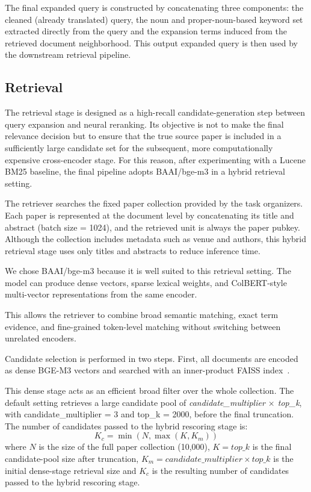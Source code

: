 The final expanded query is constructed by concatenating three components: the cleaned (already translated) query, the noun and proper-noun-based keyword set extracted directly from the query and the expansion terms induced from the retrieved document neighborhood.
This output expanded query is then used by the downstream retrieval pipeline.

\subsection{Retrieval} \label{sub:retrieval}
The retrieval stage is designed as a high-recall candidate-generation step between query expansion and neural reranking. Its objective is not to make the final relevance decision but to ensure that the true source paper is included in a sufficiently large candidate set for the subsequent, more computationally expensive cross-encoder stage. For this reason, after experimenting with a Lucene BM25 baseline, the final pipeline adopts BAAI/bge-m3 in a hybrid retrieval setting.

The retriever searches the fixed paper collection provided by the task organizers. Each paper is represented at the document level by concatenating its title and abstract (batch size = 1024), and the retrieved unit is always the paper pubkey. Although the collection includes metadata such as venue and authors, this hybrid retrieval stage uses only titles and abstracts to reduce inference time.

We chose BAAI/bge-m3 because it is well suited to this retrieval setting. The model can produce dense vectors, sparse lexical weights, and ColBERT-style multi-vector representations from the same encoder.

This allows the retriever to combine broad semantic matching, exact term evidence, and fine-grained token-level matching without switching between unrelated encoders.

Candidate selection is performed in two steps. First, all documents are encoded as dense BGE-M3 vectors and searched with an inner-product FAISS index~\cite{faiss_documentation}.

This dense stage acts as an efficient broad filter over the whole collection. The default setting retrieves a large candidate pool of \emph{candidate\_multiplier $\times$ top\_k}, with candidate\_multiplier = 3 and top\_k = 2000, before the final truncation.
The number of candidates passed to the hybrid rescoring stage is:
\[
    K_c=\min(N,\max(K,K_m))
\]
where $N$ is the size of the full paper collection (10{,}000), $K = \mathit{top\_k}$ is the final candidate-pool size after truncation, $K_m = \mathit{candidate\_multiplier} \times \mathit{top\_k}$ is the initial dense-stage retrieval size and $K_c$ is the resulting number of candidates passed to the hybrid rescoring stage.

